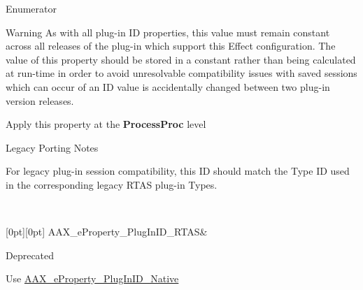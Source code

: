 \begin{DoxyEnumFields}{Enumerator}
\begin{DoxyWarning}{Warning}
As with all plug-\/in ID properties, this value must remain constant across all releases of the plug-\/in which support this Effect configuration. The value of this property should be stored in a constant rather than being calculated at run-\/time in order to avoid unresolvable compatibility issues with saved sessions which can occur of an ID value is accidentally changed between two plug-\/in version releases.
\end{DoxyWarning}
\begin{DoxyItemize}
\item Apply this property at the {\bfseries{Process\+Proc}} level\end{DoxyItemize}
\begin{DoxyRefDesc}{Legacy Porting Notes}
\item[\mbox{\hyperlink{a00787__porting_notes000043}{Legacy Porting Notes}}]For legacy plug-\/in session compatibility, this ID should match the Type ID used in the corresponding legacy R\+T\+AS plug-\/in Types. \end{DoxyRefDesc}
\\
\hline

[0pt][0pt]{}\mbox{\label{a00662_a13e384f22825afd3db6d68395b79ce0da01880753b83fc0a40d99a5381301a9cf}} 
A\+A\+X\+\_\+e\+Property\+\_\+\+Plug\+In\+I\+D\+\_\+\+R\+T\+AS&\begin{DoxyRefDesc}{Deprecated}
\item[\mbox{\hyperlink{a00788__deprecated000015}{Deprecated}}]Use \mbox{\hyperlink{a00662_a13e384f22825afd3db6d68395b79ce0da89ca3dd6e96895cda14976c1b1ceb826}{A\+A\+X\+\_\+e\+Property\+\_\+\+Plug\+In\+I\+D\+\_\+\+Native}} \end{DoxyRefDesc}
\\
\hline


\end{DoxyEnumFields}
